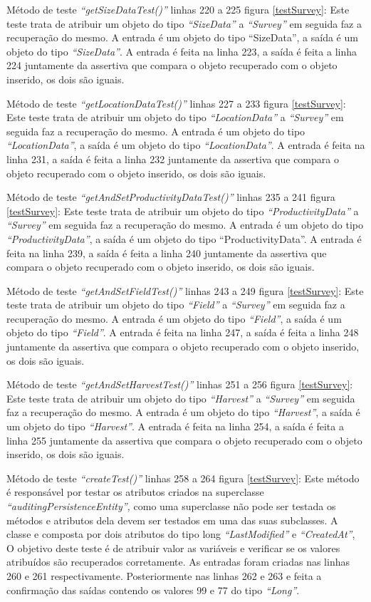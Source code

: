 Método de teste \textit{“getSizeDataTest()”} linhas 220 a 225 figura \ref{testSurvey}: Este teste trata de atribuir um objeto do tipo \textit{“SizeData”} a \textit{“Survey”} em seguida faz a recuperação do mesmo. A entrada é um objeto do tipo “SizeData”, a saída é um objeto do tipo \textit{“SizeData”}. A entrada é feita na linha 223, a saída é feita a linha 224 juntamente da assertiva que compara o objeto recuperado com o objeto inserido, os dois são iguais.

Método de teste \textit{“getLocationDataTest()”} linhas 227 a 233 figura \ref{testSurvey}: Este teste trata de atribuir um objeto do tipo \textit{“LocationData”} a \textit{“Survey”} em seguida faz a recuperação do mesmo. A entrada é um objeto do tipo \textit{“LocationData”}, a saída é um objeto do tipo \textit{“LocationData”}. A entrada é feita na linha 231, a saída é feita a linha 232 juntamente da assertiva que compara o objeto recuperado com o objeto inserido, os dois são iguais.

Método de teste \textit{“getAndSetProductivityDataTest()”} linhas 235 a 241 figura \ref{testSurvey}: Este teste trata de atribuir um objeto do tipo \textit{“ProductivityData” }a \textit{“Survey”} em seguida faz a recuperação do mesmo. A entrada é um objeto do tipo \textit{“ProductivityData”}, a saída é um objeto do tipo “ProductivityData”. A entrada é feita na linha 239, a saída é feita a linha 240 juntamente da assertiva que compara o objeto recuperado com o objeto inserido, os dois são iguais.

Método de teste \textit{“getAndSetFieldTest()”} linhas 243 a 249 figura \ref{testSurvey}: Este teste trata de atribuir um objeto do tipo \textit{“Field”} a \textit{“Survey”} em seguida faz a recuperação do mesmo. A entrada é um objeto do tipo \textit{“Field”}, a saída é um objeto do tipo \textit{“Field”}. A entrada é feita na linha 247, a saída é feita a linha 248 juntamente da assertiva que compara o objeto recuperado com o objeto inserido, os dois são iguais.

Método de teste \textit{“getAndSetHarvestTest()”} linhas 251 a 256 figura \ref{testSurvey}: Este teste trata de atribuir um objeto do tipo \textit{“Harvest”} a \textit{“Survey”} em seguida faz a recuperação do mesmo. A entrada é um objeto do tipo \textit{“Harvest”}, a saída é um objeto do tipo \textit{“Harvest”}. A entrada é feita na linha 254, a saída é feita a linha 255 juntamente da assertiva que compara o objeto recuperado com o objeto inserido, os dois são iguais.

Método de teste \textit{“createTest()”} linhas 258 a 264 figura \ref{testSurvey}: Este método é responsável por testar os atributos criados na superclasse \textit{“auditingPersistenceEntity”,} como uma superclasse não pode ser testada os métodos e atributos dela devem ser testados em uma das suas subclasses.  A classe e composta por dois atributos do tipo long \textit{“LastModified” }e \textit{“CreatedAt”}, O objetivo deste teste é de atribuir valor as variáveis e verificar se os valores atribuídos são recuperados corretamente. As entradas foram criadas nas linhas 260 e 261 respectivamente. Posteriormente nas linhas 262 e 263 e feita a confirmação das saídas contendo os valores 99 e 77 do tipo \textit{“Long”}.

